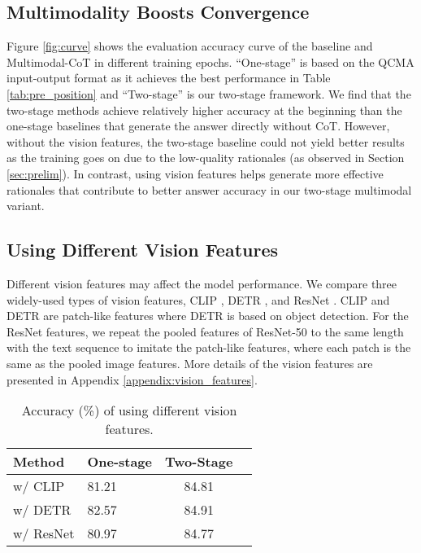 \documentclass[nohyperref]{article}
\theoremstyle{plain}
\theoremstyle{definition}
\theoremstyle{remark}
\begin{document}
\subsection{Multimodality Boosts Convergence}
Figure \ref{fig:curve} shows the evaluation accuracy curve of the baseline and Multimodal-CoT in different training epochs. {``One-stage'' is based on the QCMA input-output format as it achieves the best performance in Table \ref{tab:pre_position} and ``Two-stage'' is our two-stage framework.} We find that the two-stage methods achieve relatively higher accuracy at the beginning than the {one-stage} baselines that generate the answer directly without CoT. However, without the vision features, the two-stage baseline could not yield better results as the training goes on due to the low-quality rationales (as observed in Section \ref{sec:prelim}). In contrast, 
using vision features helps generate more effective rationales that contribute to better answer accuracy in our two-stage multimodal variant.


\subsection{Using Different Vision Features}\label{sec:vision_features}
Different vision features may affect the model performance. We compare three widely-used types of vision features, CLIP \citep{radford2021learning}, DETR \citep{carion2020end}, and ResNet \citep{he2016deep}. CLIP and DETR are patch-like features where DETR is based on object detection. For the ResNet features, we repeat the pooled features of ResNet-50 to the same length with the text sequence to imitate the patch-like features, where each patch is the same as the pooled image features. More details of the vision features are presented in Appendix \ref{appendix:vision_features}.

\begin{table}[htb]
\vspace{-3.6mm}
    \centering\small
        \caption{Accuracy (\%) of using different vision features. \label{tab:visual_features}}
   \setlength{\tabcolsep}{10pt}
\begin{tabular}{llcc}\toprule
 {Method}  & {One-stage} & {Two-Stage}\\\midrule
\quad w/ CLIP  & 81.21 & 84.81\\
 \quad w/ DETR  & 82.57 & 84.91\\
 \quad w/ ResNet & 80.97 & 84.77\\
\bottomrule
\end{tabular}
\vspace{-3.6mm}
\end{table}
\end{document}

